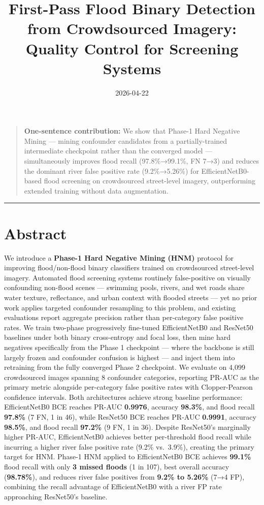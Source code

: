 \documentclass[
  11pt,
]{article}
\title{First-Pass Flood Binary Detection from Crowdsourced Imagery:
Quality Control for Screening Systems}
\author{}
\date{2026-04-22}
\begin{document}
\maketitle

\begin{quote}
\textbf{One-sentence contribution:} We show that Phase-1 Hard Negative
Mining --- mining confounder candidates from a partially-trained
intermediate checkpoint rather than the converged model ---
simultaneously improves flood recall (97.8\%→99.1\%, FN 7→3) and reduces
the dominant river false positive rate (9.2\%→5.26\%) for
EfficientNetB0-based flood screening on crowdsourced street-level
imagery, outperforming extended training without data augmentation.
\end{quote}

\begin{center}\rule{0.5\linewidth}{0.5pt}\end{center}

\section{Abstract}\label{abstract}

We introduce a \textbf{Phase-1 Hard Negative Mining (HNM)} protocol for
improving flood/non-flood binary classifiers trained on crowdsourced
street-level imagery. Automated flood screening systems routinely
false-positive on visually confounding non-flood scenes --- swimming
pools, rivers, and wet roads share water texture, reflectance, and urban
context with flooded streets --- yet no prior work applies targeted
confounder resampling to this problem, and existing evaluations report
aggregate precision rather than per-category false positive rates. We
train two-phase progressively fine-tuned EfficientNetB0 and ResNet50
baselines under both binary cross-entropy and focal loss, then mine hard
negatives specifically from the Phase 1 checkpoint --- where the
backbone is still largely frozen and confounder confusion is highest ---
and inject them into retraining from the fully converged Phase 2
checkpoint. We evaluate on 4,099 crowdsourced images spanning 8
confounder categories, reporting PR-AUC as the primary metric alongside
per-category false positive rates with Clopper-Pearson confidence
intervals. Both architectures achieve strong baseline performance:
EfficientNetB0 BCE reaches PR-AUC \textbf{0.9976}, accuracy
\textbf{98.3\%}, and flood recall \textbf{97.8\%} (7 FN, 1 in 46), while
ResNet50 BCE reaches PR-AUC \textbf{0.9991}, accuracy \textbf{98.5\%},
and flood recall \textbf{97.2\%} (9 FN, 1 in 36). Despite ResNet50's
marginally higher PR-AUC, EfficientNetB0 achieves better per-threshold
flood recall while incurring a higher river false positive rate (9.2\%
vs.~3.9\%), creating the primary target for HNM. Phase-1 HNM applied to
EfficientNetB0 BCE achieves \textbf{99.1\%} flood recall with only
\textbf{3 missed floods} (1 in 107), best overall accuracy
(\textbf{98.78\%}), and reduces river false positives from \textbf{9.2\%
to 5.26\%} (7→4 FP), combining the recall advantage of EfficientNetB0
with a river FP rate approaching ResNet50's baseline.
\end{document}

